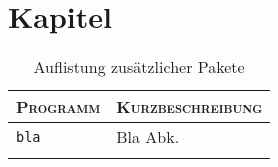 \section{Kapitel}\label{sec:kapitel}


\begin{longtable}{p{}|p{}}
	\toprule
	{\large\textsc{Programm}} & {\large\textsc{Kurzbeschreibung}} \\
	\midrule[1pt]
	\texttt{bla\cite{example}} & Bla \ac{Abk.} \\
	\midrule
	\bottomrule
	\caption{Auflistung zusätzlicher Pakete}
	\label{tab:software}
\end{longtable}
